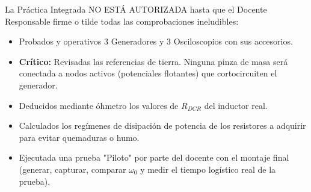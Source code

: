 \documentclass[11pt, a4paper]{article}
\begin{document}
\vspace{0.6cm}
\begin{tcolorbox}[colback=gray!5, colframe=black, title=\textbf{Gate de Autorización Docente y Seguridad (Hito de Validación)}]
La Práctica Integrada NO ESTÁ AUTORIZADA hasta que el Docente Responsable firme o tilde todas las comprobaciones ineludibles:
\begin{itemize}
    \item[$\square$] Probados y operativos 3 Generadores y 3 Osciloscopios con sus accesorios.
    \item[$\square$] \textbf{Crítico:} Revisadas las referencias de tierra. Ninguna pinza de masa será conectada a nodos activos (potenciales flotantes) que cortocircuiten el generador.
    \item[$\square$] Deducidos mediante óhmetro los valores de $R_{DCR}$ del inductor real.
    \item[$\square$] Calculados los regímenes de disipación de potencia de los resistores a adquirir para evitar quemaduras o humo.
    \item[$\square$] Ejecutada una prueba "Piloto" por parte del docente con el montaje final (generar, capturar, comparar $\omega_0$ y medir el tiempo logístico real de la prueba).
\end{itemize}
\end{tcolorbox}
\end{document}
